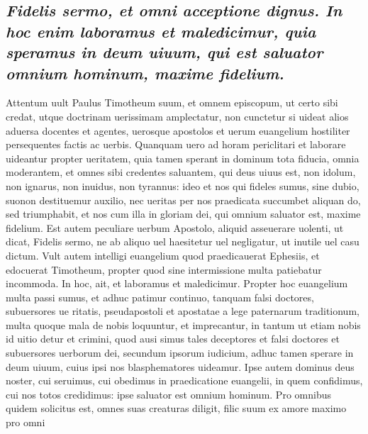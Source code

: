 \documentclass{article}
\begin{document}
\begin{pages}
\subsection*{\textit{Fidelis sermo, et omni acceptione dignus. In hoc enim laboramus et maledicimur, quia speramus in deum uiuum, qui est saluator omnium hominum, maxime fidelium. }}\pstart Attentum uult Paulus Timotheum suum, et omnem episcopum, ut certo sibi credat, utque doctrinam uerissimam amplectatur, non cunctetur si uideat alios aduersa docentes et agentes, uerosque apostolos et uerum euangelium hostiliter persequentes factis ac uerbis. Quanquam uero ad horam periclitari et laborare uideantur propter ueritatem, quia tamen sperant in dominum tota fiducia, omnia moderantem, et omnes sibi credentes saluantem, qui deus uiuus est, non idolum, non ignarus, non inuidus, non tyrannus: ideo et nos qui fideles sumus, sine dubio, suonon destituemur auxilio, nec ueritas per nos praedicata succumbet aliquan do, sed triumphabit, et nos cum illa in gloriam dei, qui omnium saluator est, maxime fidelium. Est autem peculiare uerbum Apostolo, aliquid asseuerare uolenti, ut dicat, Fidelis sermo, ne ab aliquo uel haesitetur uel negligatur, ut inutile uel casu dictum. Vult autem intelligi euangelium quod praedicauerat Ephesiis, et edocuerat Timotheum, propter quod sine intermissione multa patiebatur incommoda. In hoc, ait, et laboramus et maledicimur. Propter hoc euangelium multa passi sumus, et adhuc patimur continuo, tanquam falsi doctores, subuersores ue ritatis, pseudapostoli et apostatae a lege paternarum traditionum, multa quoque mala de nobis loquuntur, et imprecantur, in tantum ut etiam nobis id uitio detur et crimini, quod ausi simus tales deceptores et falsi doctores et subuersores uerborum dei, secundum ipsorum iudicium, adhuc tamen sperare in deum uiuum, cuius ipsi nos blasphematores uideamur. Ipse autem dominus deus noster, cui seruimus, cui obedimus in praedicatione euangelii, in quem confidimus, cui nos totos credidimus: ipse saluator est omnium hominum. Pro omnibus quidem solicitus est, omnes suas creaturas diligit, filic suum ex amore maximo pro omni  \pend

\end{pages}
\end{document}
